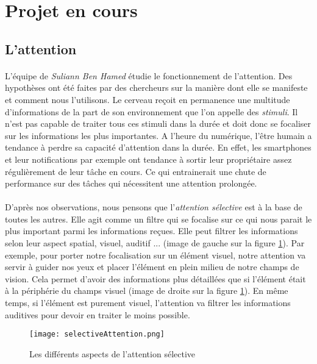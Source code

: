 \section{Projet en cours}

\subsection{L'attention}

\paragraph{}L'équipe de \emph{Suliann Ben Hamed} étudie le fonctionnement de l'attention. Des hypothèses ont été faites par des chercheurs sur la manière dont elle se manifeste et
comment nous l'utilisons. Le cerveau reçoit en permanence une multitude d'informations de la part de son environnement que l'on appelle des \emph{stimuli}. Il n'est pas capable de
traiter tous ces stimuli dans la durée et doit donc se focaliser sur les informations les plus importantes. A l'heure du numérique, l'être humain a tendance à perdre sa capacité
d'attention dans la durée. En effet, les smartphones et leur notifications par exemple ont tendance à sortir leur propriétaire assez régulièrement de leur tâche en cours. Ce qui
entrainerait une chute de performance sur des tâches qui nécessitent une attention prolongée.

\paragraph{}D'après nos observations, nous pensons que l'\emph{attention sélective} est à la base de toutes les autres. Elle agit comme un filtre qui se focalise sur ce qui nous
parait le plus important parmi les informations reçues. Elle peut filtrer les informations selon leur aspect spatial, visuel, auditif ... (image de gauche sur la figure 
\ref{AspectSelectiveAttention}). Par exemple, pour porter notre focalisation sur un élément visuel, notre attention va servir à guider nos yeux et placer l'élément en plein milieu de
notre champs de vision. Cela permet d'avoir des informations plus détaillées que si l'élément était à la périphérie du champs visuel (image de droite sur la figure
\ref{AspectSelectiveAttention}). En même temps, si l'élément est purement visuel, l'attention va filtrer les informations auditives pour devoir en traiter le moins possible.

\begin{figure}[h]
    \begin{center}
    \texttt{[image: selectiveAttention.png]}
    \end{center}
    \caption{Les différents aspects de l'attention sélective}
\label{AspectSelectiveAttention}
\end{figure}

